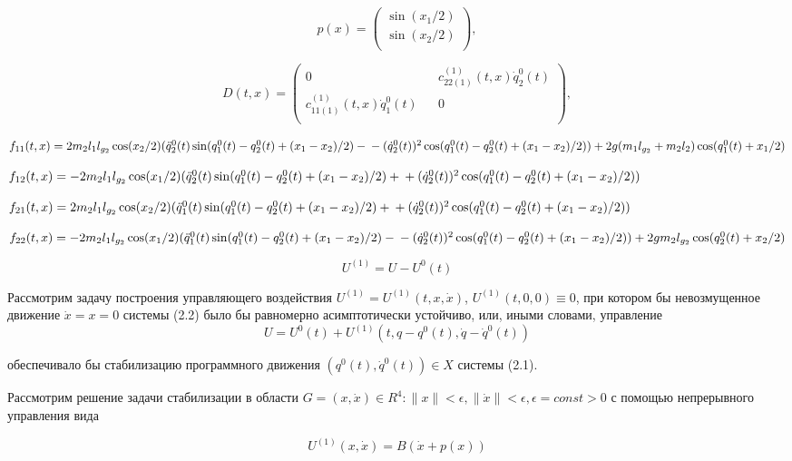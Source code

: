 $$p(x) =
\begin{pmatrix}
\sin(x_1/2) \\
\sin(x_2/2)\\
\end{pmatrix},$$

$$D(t, x) =
\begin{pmatrix}
0 && c_{22(1)}^{(1)}(t,x) \dot q_2^0(t) \\
c_{11(1)}^{(1)}(t,x) \dot q_1^0(t) && 0 \\
\end{pmatrix},$$

$f_{11}(t,x) = 2m_2l_1l_{g_2} \cos(x_2/2) (\ddot q_2^0(t) \sin(q_1^0(t) - q_2^0(t) + (x_1 - x_2)/2) - \\ - (\dot q_2^0(t))^2 \cos(q_1^0(t) - q_2^0(t) + (x_1 - x_2)/2)) + 2g(m_1 l_{g_2} + m_2 l_2) \cos(q_1^0(t) + x_1/2)$

$f_{12}(t,x) = - 2 m_2 l_1 l_{g_2} \cos(x_1/2) (\ddot q_2^0(t) \sin(q_1^0(t) - q_2^0(t) + (x_1 - x_2)/2) + \\ + (\dot q_2^0(t))^2 \cos(q_1^0(t) - q_2^0(t) + (x_1 - x_2)/2))$

$f_{21}(t,x) = 2 m_2 l_1 l_{g_2} \cos(x_2/2) (\ddot q_1^0(t) \sin(q_1^0(t) - q_2^0(t) + (x_1 - x_2)/2) + \\ + (\dot q_2^0(t))^2 \cos(q_1^0(t) - q_2^0(t) + (x_1 - x_2)/2))$

$f_{22}(t,x) = - 2m_2 l_1 l_{g_2} \cos(x_1/2) (\ddot q_1^0(t) \sin(q_1^0(t) - q_2^0(t) + (x_1 - x_2)/2) - \\ - (\dot q_2^0(t))^2 \cos(q_1^0(t) - q_2^0(t) + (x_1 - x_2)/2)) + 2 g m_2 l_{g_2} \cos(q_2^0(t) + x_2/2)$

$$ U^{(1)} = U - U^{0}(t) $$

Рассмотрим задачу построения управляющего воздействия  $ U^{(1)} = U^{(1)}(t, x, \dot x) $, $ U^{(1)} (t, 0, 0) \equiv 0 $, при котором бы невозмущенное движение $\dot x = x = 0$  системы (2.2) было бы равномерно асимптотически устойчиво, или, иными словами, управление $$U = U^0(t) + U^{(1)}(t, q-q^0(t), \dot q - \dot q^0(t))$$

обеспечивало бы стабилизацию программного движения $(q^0(t), \dot q^0(t)) \in X$  системы (2.1).

Рассмотрим решение задачи стабилизации в области 
$G = {(x, \dot x) \in R^4 : \|x\|<\epsilon, \|\dot x\|<\epsilon, \epsilon=const>0}$
с помощью непрерывного управления вида

$$U^{(1)}(x, \dot x) = B(\dot x + p(x))$$ \label{2.3'}     

